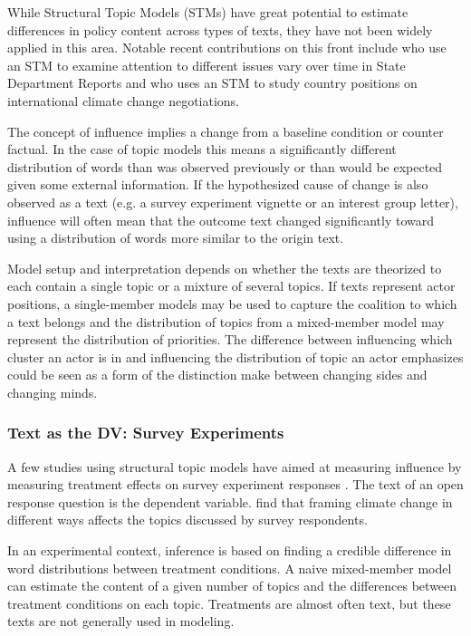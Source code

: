 \documentclass{article}
\begin{document}
While Structural Topic Models (STMs) have great potential to estimate differences in policy content across types of texts, they have not been widely applied in this area. Notable recent contributions on this front include \citet{Bagozzi2016} who use an STM to examine attention to different issues vary over time in State Department Reports and \citet{Genovese2017SectorsFrom} who uses an STM to study country positions on international climate change negotiations. %

The concept of influence implies a change from a baseline condition or counter factual. In the case of topic models this means a significantly different distribution of words than was observed previously or than would be expected given some external information. If the hypothesized cause of change is also observed as a text (e.g. a survey experiment vignette or an interest group letter), influence will often mean that the outcome text changed significantly toward using a distribution of words more similar to the origin text. 

Model setup and interpretation depends on whether the texts are theorized to each contain a single topic or a mixture of several topics. If texts represent actor positions, a single-member models may be used to capture the coalition to which a text belongs and the distribution of topics from a mixed-member model may represent the distribution of priorities. The difference between influencing which cluster an actor is in and influencing the distribution of topic an actor emphasizes could be seen as a form of the distinction \citet{Carsey2006} make between changing sides and changing minds.

\subsubsection{Text as the DV: Survey Experiments}
A few studies using structural topic models have aimed at measuring influence by measuring treatment effects on survey experiment responses \citep{Roberts2014,Mildenberger2015,Fong2016}. The text of an open response question is the dependent variable. \citet{Mildenberger2015} find that framing climate change in different ways affects the topics discussed by survey respondents.

In an experimental context, inference is based on finding a credible difference in word distributions between treatment conditions. A naive mixed-member model can estimate the content of a given number of topics and the differences between treatment conditions on each topic. Treatments are almost often text, but these texts are not generally used in modeling. 
\end{document}
